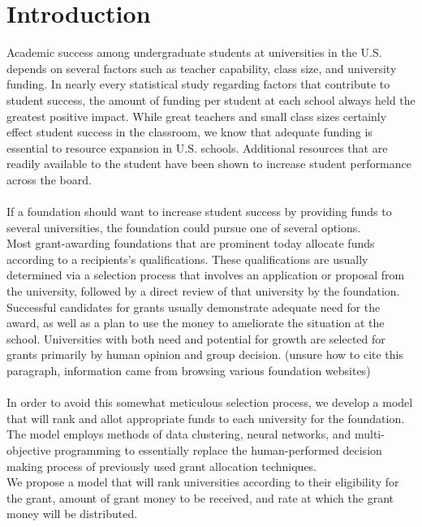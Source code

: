 \documentclass[paper.tex]{subfiles}
\begin{document}
	\section{Introduction}
	Academic success among undergraduate students at universities in the U.S. depends on several factors such as teacher capability, class size, and university funding. In nearly every statistical study regarding factors that contribute to student success, the amount of funding per student at each school always held the greatest positive impact.\cite{greenwald1996effect}  While great teachers and small class sizes certainly effect student success in the classroom, we know that adequate funding is essential to resource expansion in U.S. schools.\cite{hedges1994exchange} Additional resources that are readily available to the student have been shown to increase student performance across the board. 
	\\\\
	If a foundation should want to increase student success by providing funds to several universities, the foundation could pursue one of several options.
	\\
	Most grant-awarding foundations that are prominent today allocate funds according to a recipients's qualifications. These qualifications are usually determined via a selection process that involves an application or proposal from the university, followed by a direct review of that university by the foundation. Successful candidates for grants usually demonstrate adequate need for the award, as well as a plan to use the money to ameliorate the situation at the school. Universities with both need and potential for growth are selected for grants primarily by human opinion and group decision. (unsure how to cite this paragraph, information came from browsing various foundation websites)
	\\
	\\
	In order to avoid this somewhat meticulous selection process, we develop a model that will rank and allot appropriate funds to each university for the foundation. The model employs methods of data clustering, neural networks, and multi-objective programming to essentially replace the human-performed decision making process of previously used grant allocation techniques.
	\\
	We propose a model that will rank universities according to their eligibility for the grant, amount of grant money to be received, and rate at which the grant money will be distributed.
	
	
	
\end{document}
